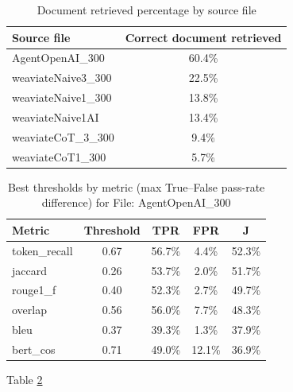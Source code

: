 \begin{table}[htbp]
    \centering
    \begin{tabular}{l c}
        \hline
        Source file & Correct document retrieved \\
        \hline
    AgentOpenAI\_300 & 60.4\% \\
    weaviateNaive3\_300 & 22.5\% \\
    weaviateNaive1\_300 & 13.8\% \\
    weaviateNaive1AI & 13.4\% \\
    weaviateCoT\_3\_300 & 9.4\% \\
    weaviateCoT1\_300 & 5.7\% \\
        \hline
    \end{tabular}
    \caption{Document retrieved percentage by source file}
    \label{tab:doc-retrieved-by-source}
\end{table}

\begin{table}[htbp]
  \centering
  \begin{tabular}{l c c c c}
    \hline
    Metric & Threshold & TPR & FPR & J \\
    \hline
    token\_recall & 0.67 & 56.7\% & 4.4\%  & 52.3\% \\
    jaccard       & 0.26 & 53.7\% & 2.0\%  & 51.7\% \\
    rouge1\_f     & 0.40 & 52.3\% & 2.7\%  & 49.7\% \\
    overlap       & 0.56 & 56.0\% & 7.7\%  & 48.3\% \\
    bleu          & 0.37 & 39.3\% & 1.3\%  & 37.9\% \\
    bert\_cos     & 0.71 & 49.0\% & 12.1\% & 36.9\% \\
    \hline
  \end{tabular}
    \caption{Best thresholds by metric (max True--False pass-rate difference) for File: AgentOpenAI\_300}
    \label{tab:agentopenai300-best-thresholds}
\end{table}

Table \ref{tab:agentopenai300-best-thresholds}

